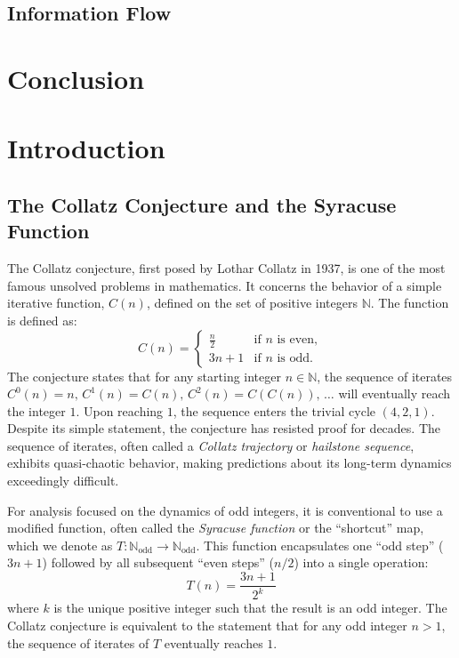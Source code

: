 \documentclass[12pt]{article}
\theoremstyle{plain}
\theoremstyle{definition}
\begin{document}
    \subsection{Information Flow}

\section{Conclusion}


\section{Introduction}
\subsection{The Collatz Conjecture and the Syracuse Function}

The Collatz conjecture, first posed by Lothar Collatz in 1937, is one of the most famous unsolved problems in mathematics. It concerns the behavior of a simple iterative function, $C(n)$, defined on the set of positive integers $\mathbb{N}$. The function is defined as:
\[
C(n) = 
\begin{cases}
\frac{n}{2} & \text{if } n \text{ is even}, \\
3n+1        & \text{if } n \text{ is odd}.
\end{cases}
\]
The conjecture states that for any starting integer $n \in \mathbb{N}$, the sequence of iterates $C^0(n) = n,\, C^1(n) = C(n),\, C^2(n) = C(C(n)),\, \ldots$ will eventually reach the integer $1$. Upon reaching $1$, the sequence enters the trivial cycle $(4, 2, 1)$. Despite its simple statement, the conjecture has resisted proof for decades. The sequence of iterates, often called a \emph{Collatz trajectory} or \emph{hailstone sequence}, exhibits quasi-chaotic behavior, making predictions about its long-term dynamics exceedingly difficult.

For analysis focused on the dynamics of odd integers, it is conventional to use a modified function, often called the \emph{Syracuse function} or the ``shortcut'' map, which we denote as $T\colon \mathbb{N}_{\text{odd}} \to \mathbb{N}_{\text{odd}}$. This function encapsulates one ``odd step'' ($3n+1$) followed by all subsequent ``even steps'' ($n/2$) into a single operation:
\[
T(n) = \frac{3n+1}{2^k}
\]
where $k$ is the unique positive integer such that the result is an odd integer. The Collatz conjecture is equivalent to the statement that for any odd integer $n > 1$, the sequence of iterates of $T$ eventually reaches $1$.
\end{document}
